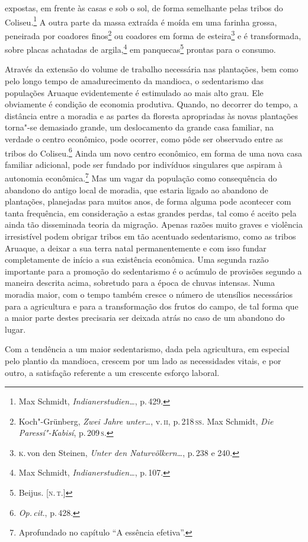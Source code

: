 expostas, em frente às casas e sob o sol, de forma semelhante pelas tribos
do Coliseu.\footnote{Max Schmidt,
  \textit{Indianerstudien\ldots}, p.\,429.} A outra parte da
massa extraída é moída em uma farinha grossa, peneirada por coadores
finos\footnote{Koch"-Grünberg, \textit{Zwei Jahre unter\ldots}, v.\,\textsc{ii}, p.\,218\,\textsc{ss}. Max Schmidt, \textit{Die Paressí"-Kabisí}, p.\,209\,\textsc{s}.} ou
coadores em forma de esteira\footnote{\textsc{k}.\,von den Steinen, \textit{Unter den Naturvölkern\ldots}, p.\,238 e 240.} e é transformada,
sobre placas achatadas de argila,\footnote{Max Schmidt,
  \textit{Indianerstudien\ldots}, p.\,107.} em panquecas\footnote{Beijus. {[}\textsc{n.\,t.}{]}}
 prontas para o consumo.

Através da extensão do volume de trabalho necessária nas plantações, bem
como pelo longo tempo de amadurecimento da mandioca, o sedentarismo das
populações Aruaque evidentemente é estimulado ao mais alto grau. Ele
obviamente é condição de economia produtiva. Quando, no decorrer do
tempo, a distância entre a moradia e as partes da floresta apropriadas às
novas plantações torna"-se demasiado grande, um deslocamento da
grande casa familiar, na verdade o centro econômico, pode ocorrer, como
pôde ser observado entre as tribos do Coliseu.\footnote{\textit{Op.\,cit}., p.\,428.}
Ainda um novo centro econômico, em forma de uma nova casa familiar
adicional, pode ser fundado por indivíduos singulares que aspiram à
autonomia econômica.\footnote{Aprofundado no capítulo ``A essência efetiva''.} Mas um vagar da população
como consequência do abandono do antigo local de moradia, que estaria
ligado ao abandono de plantações, planejadas para muitos anos, de forma
alguma pode acontecer com tanta frequência, em consideração a estas
grandes perdas, tal como é aceito pela ainda tão disseminada teoria da
migração. Apenas razões muito graves e violência irresistível podem
obrigar tribos em tão acentuado sedentarismo, como as tribos Aruaque, a
deixar a sua terra natal permanentemente e com isso fundar
completamente de início a sua existência econômica. Uma segunda razão
importante para a promoção do sedentarismo é o acúmulo de provisões
segundo a maneira descrita acima, sobretudo para a época de chuvas
intensas. Numa moradia maior, com o tempo também cresce o
número de utensílios necessários para a agricultura e para a
transformação dos frutos do campo, de tal forma que a maior parte destes
precisaria ser deixada atrás no caso de um abandono do lugar.

Com a tendência a um maior sedentarismo, dada pela agricultura, em
especial pelo plantio da mandioca, crescem por um lado as necessidades
vitais, e por outro, a satisfação referente a um
crescente esforço laboral.

